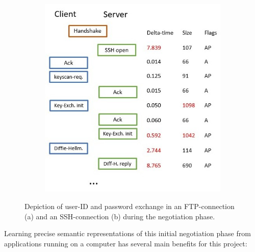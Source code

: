 \documentclass[a4paper,12pt,twoside]{report}
\begin{document}
\begin{figure}
\begin{subfigure}[b]{0.49\textwidth}
\includegraphics[width=\textwidth]{images/SSH.jpg}
\caption{}
\end{subfigure}
\caption{Depiction of user-ID and password exchange in an FTP-connection (a) and an SSH-connection (b) during the negotiation phase.}
\end{figure}




Learning precise semantic representations of this initial negotiation phase from applications running on a computer has several main benefits for this project: 
\end{document}

